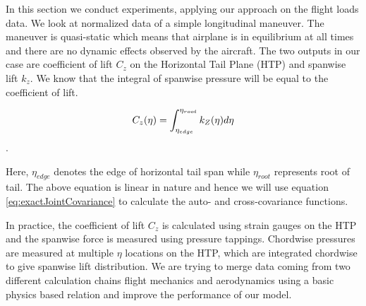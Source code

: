 In this section we conduct experiments, applying our approach on the flight loads data. We look at normalized data of a simple longitudinal maneuver. The maneuver is quasi-static which means that airplane is in equilibrium at all times and there are no dynamic effects observed by the aircraft. The two outputs in our case are coefficient of lift \(C_{z}\) on the Horizontal Tail Plane (HTP) and spanwise lift \(k_{z}\). We know that the integral of spanwise pressure will be equal to the coefficient of lift.

\begin{equation}\label{eq:relationCzKz}
\centering
C_{z}(\eta) = \int_{\eta_{edge}}^{\eta_{root}} k_{Z}(\eta)d\eta
\end{equation}.

Here, \(\eta_{edge}\) denotes the edge of horizontal tail span while \(\eta_{root}\) represents root of tail. The above equation is linear in nature and hence we will use equation \ref{eq:exactJointCovariance} to calculate the auto- and cross-covariance functions.

In practice, the coefficient of lift \(C_{z}\) is calculated using strain gauges on the HTP and the spanwise force is measured using pressure tappings. Chordwise pressures are measured at multiple \(\eta\) locations on the HTP, which are integrated chordwise to give spanwise lift distribution. We are trying to merge data coming from two different calculation chains flight mechanics and aerodynamics using a basic physics based relation and improve the performance of our model.

